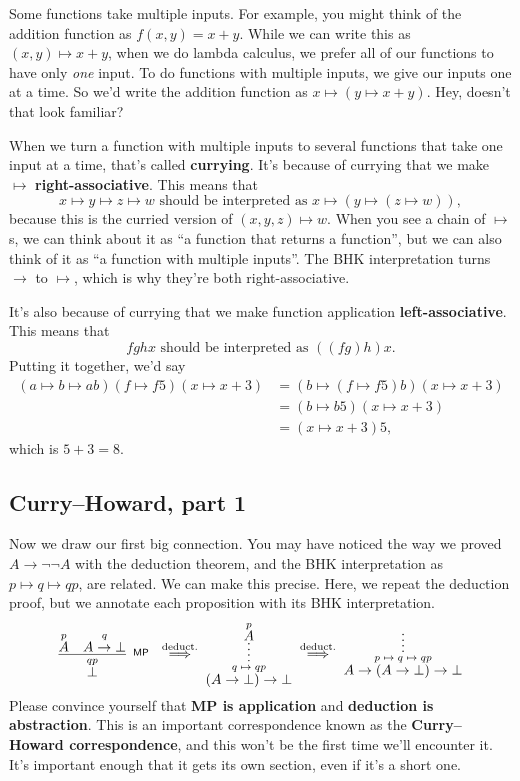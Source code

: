\documentclass[11pt,paper=letter]{scrartcl}
\newcommand{\sf}{\mathsf}
\renewcommand{\lnot}{\neg}
\newcommand{\vc}[1]{\vcenter{\hbox{#1}}}
\begin{document}
Some functions take multiple inputs. For example, you might think of the addition function as $f(x, y) = x + y$. While we can write this as $(x, y) \mapsto x + y$, when we do lambda calculus, we prefer all of our functions to have only \emph{one} input. To do functions with multiple inputs, we give our inputs one at a time. So we'd write the addition function as $x \mapsto (y \mapsto x + y)$. Hey, doesn't that look familiar?

When we turn a function with multiple inputs to several functions that take one input at a time, that's called \textbf{currying}. It's because of currying that we make $\mapsto$ \textbf{right-associative}. This means that \[
  x \mapsto y \mapsto z \mapsto w
  \text{ should be interpreted as }
  x \mapsto (y \mapsto (z \mapsto w)),
\]
because this is the curried version of $(x, y, z) \mapsto w$. When you see a chain of $\mapsto$s, we can think about it as ``a function that returns a function'', but we can also think of it as ``a function with multiple inputs''. The BHK interpretation turns $\to$ to $\mapsto$, which is why they're both right-associative.

It's also because of currying that we make function application \textbf{left-associative}. This means that \[
  fghx \text{ should be interpreted as } ((fg)h)x.
\]
Putting it together, we'd say
\begin{align*}
(a \mapsto b \mapsto ab)(f \mapsto f5)(x \mapsto x + 3)
&= (b \mapsto (f \mapsto f5)b)(x \mapsto x + 3) \\
&= (b \mapsto b5)(x \mapsto x + 3)\\
&= (x \mapsto x + 3)5,
\end{align*}
which is $5 + 3 = 8$.

\subsection{Curry--Howard, part 1}

Now we draw our first big connection. You may have noticed the way we proved $A \to \lnot\lnot A$ with the deduction theorem, and the BHK interpretation as $p \mapsto q \mapsto qp$, are related. We can make this precise. Here, we repeat the deduction proof, but we annotate each proposition with its BHK interpretation.
\begin{align*}
\vc{\infer[^\sf{MP}]
{
\overset{qp}{\false}
}
{\overset{p}{A} & \overset{q}{A \to \false}}
}
\;\overset{\text{deduct.}}{\implies}\;
\vc{\infer*
{\overset{q\;\mapsto\;qp}{(A \to \false) \to \false}}
{\overset{p}{A}}}
\;\overset{\text{deduct.}}{\implies}\;
\vc{\infer*
{\overset{p\;\mapsto\;q\;\mapsto\;qp}{A \to (A \to \false) \to \false}}
{}}
\end{align*}
Please convince yourself that \textbf{\textsf{MP} is application} and \textbf{deduction is abstraction}. This is an important correspondence known as the \textbf{Curry--Howard correspondence}, and this won't be the first time we'll encounter it. It's important enough that it gets its own section, even if it's a short one.
\end{document}
